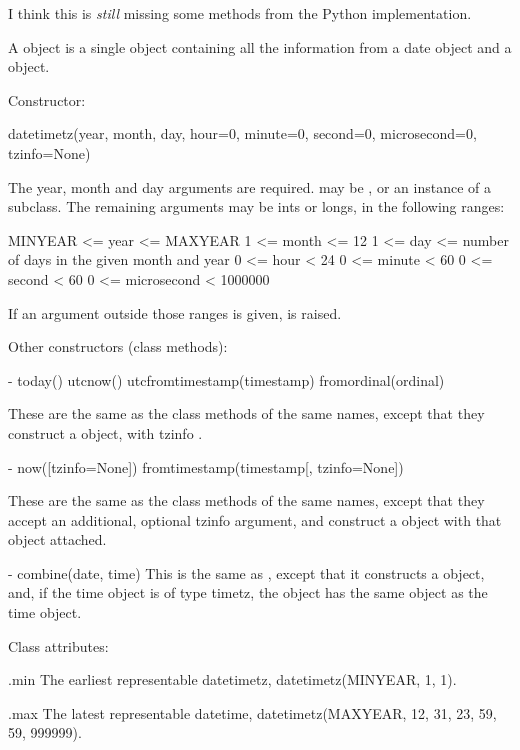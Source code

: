 \begin{notice}[warning]
  I think this is \emph{still} missing some methods from the
  Python implementation.
\end{notice}

A  object is a single object containing all the information
from a date object and a  object.

Constructor:

    datetimetz(year, month, day,
               hour=0, minute=0, second=0, microsecond=0, tzinfo=None)

    The year, month and day arguments are required.   may
    be , or an instance of a  subclass.  The
    remaining arguments may be ints or longs, in the following ranges:

        MINYEAR <= year <= MAXYEAR
        1 <= month <= 12
        1 <= day <= number of days in the given month and year
        0 <= hour < 24
        0 <= minute < 60
        0 <= second < 60
        0 <= microsecond < 1000000

    If an argument outside those ranges is given,
     is raised.

Other constructors (class methods):

  - today()
    utcnow()
    utcfromtimestamp(timestamp)
    fromordinal(ordinal)

    These are the same as the  class methods of the
    same names, except that they construct a 
    object, with tzinfo .

  - now([tzinfo=None])
    fromtimestamp(timestamp[, tzinfo=None])

    These are the same as the  class methods of the same names,
    except that they accept an additional, optional tzinfo argument, and
    construct a  object with that  object attached.

  - combine(date, time)
    This is the same as , except that it constructs
    a  object, and, if the time object is of type timetz,
    the  object has the same  object as the time object.

Class attributes:

    .min
        The earliest representable datetimetz,
        datetimetz(MINYEAR, 1, 1).

    .max
        The latest representable datetime,
        datetimetz(MAXYEAR, 12, 31, 23, 59, 59, 999999).

